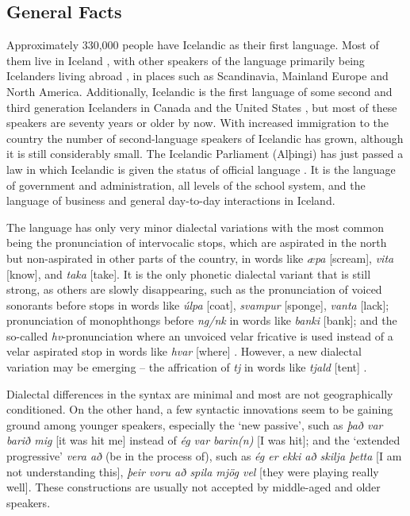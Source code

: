 \documentclass{../../metanetpaper}
\begin{document}
\begin{multicols}{2}

\subsection{General Facts}

Approximately 330,000 people have Icelandic as their first language. Most of them live in Iceland \cite{hag1},  with other speakers of the language primarily being Icelanders living abroad \cite{vis1},  in places such as Scandinavia, Mainland Europe and North America. Additionally, Icelandic is the first language of some second and third generation Icelanders in Canada and the United States \cite{can1},  but most of these speakers are seventy years or older by now. With increased immigration to the country the number of second-language speakers of Icelandic has grown, although it is still considerably small. 
The Icelandic Parliament (Alþingi) has just passed a law in which Icelandic is given the status of official language \cite{alt1}.  It is the language of government and administration, all levels of the school system, and the language of business and general day-to-day interactions in Iceland.

The language has only very minor dialectal variations with the most common being the pronunciation of intervocalic stops, which are aspirated in the north but non-aspirated in other parts of the country, in words like \textit{æpa} {[}scream{]}, \textit{vita} {[}know{]}, and \textit{taka} {[}take{]}. It is the only phonetic dialectal variant that is still strong, as others are slowly disappearing, such as the pronunciation of voiced sonorants before stops in words like \textit{úlpa} {[}coat{]}, \textit{svampur} {[}sponge{]}, \textit{vanta} {[}lack{]}; pronunciation of monophthongs before \textit{ng/nk} in words like \textit{banki} {[}bank{]}; and the so-called \textit{hv}-pronunciation where an unvoiced velar fricative is used instead of a velar aspirated stop in words like \textit{hvar} {[}where{]} \cite{mal1}.  However, a new dialectal variation may be emerging -- the affrication of \textit{tj} in words like \textit{tjald} {[}tent{]} \cite{tvi1}. 

Dialectal differences in the syntax are minimal and most are not geographically conditioned. On the other hand, a few syntactic innovations seem to be gaining ground among younger speakers, especially the ‘new passive’, such as \textit{það var barið mig} {[}it was hit me{]} instead of \textit{ég var barin(n)} {[}I was hit{]}; and the ‘extended progressive’ \textit{vera að} (be in the process of), such as \textit{ég er ekki að skilja þetta} {[}I am not understanding this{]}, \textit{þeir voru að spila mjög vel} {[}they were playing really well{]}. These constructions are usually not accepted by middle-aged and older speakers.


\end{multicols}
\end{document}
